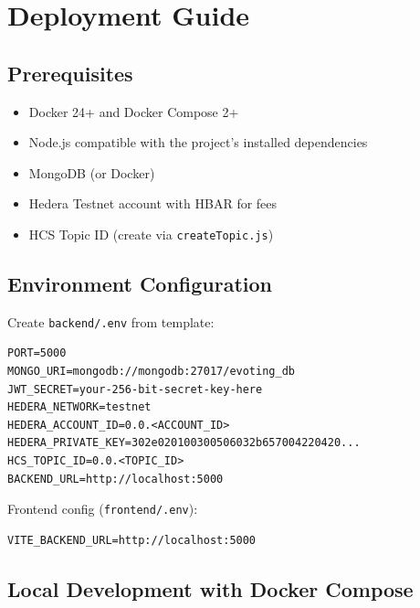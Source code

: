 \chapter{Deployment Guide}
\label{app:deployment}

\section{Prerequisites}
\label{sec:prereqs}
\begin{itemize}
    \item Docker 24+ and Docker Compose 2+
    \item Node.js compatible with the project's installed dependencies
    \item MongoDB (or Docker)
    \item Hedera Testnet account with HBAR for fees
    \item HCS Topic ID (create via \texttt{createTopic.js})
\end{itemize}

\section{Environment Configuration}
\label{sec:env-config}

Create \texttt{backend/.env} from template:

\begin{lstlisting}[style=codeStyle, caption=Backend .env template]
PORT=5000
MONGO_URI=mongodb://mongodb:27017/evoting_db
JWT_SECRET=your-256-bit-secret-key-here
HEDERA_NETWORK=testnet
HEDERA_ACCOUNT_ID=0.0.<ACCOUNT_ID>
HEDERA_PRIVATE_KEY=302e020100300506032b657004220420...
HCS_TOPIC_ID=0.0.<TOPIC_ID>
BACKEND_URL=http://localhost:5000
\end{lstlisting}

Frontend config (\texttt{frontend/.env}):
\begin{lstlisting}[style=codeStyle, caption=Frontend .env]
VITE_BACKEND_URL=http://localhost:5000
\end{lstlisting}

\section{Local Development with Docker Compose}
\label{sec:docker-dev}


